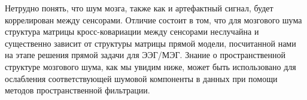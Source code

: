Нетрудно понять, что шум мозга, также как и артефактный сигнал, будет коррелирован между сенсорами.
Отличие состоит в том, что для мозгового шума структура матрицы кросс-ковариации между сенсорами
неслучайна и существенно зависит от структуры матрицы прямой модели,
посчитанной нами на этапе решения прямой задачи для ЭЭГ/МЭГ.
Знание о пространственной структуре мозгового шума, как мы увидим ниже, может быть использовано для
ослабления соответствующей шумовой компоненты в данных при помощи методов пространственной фильтрации.










